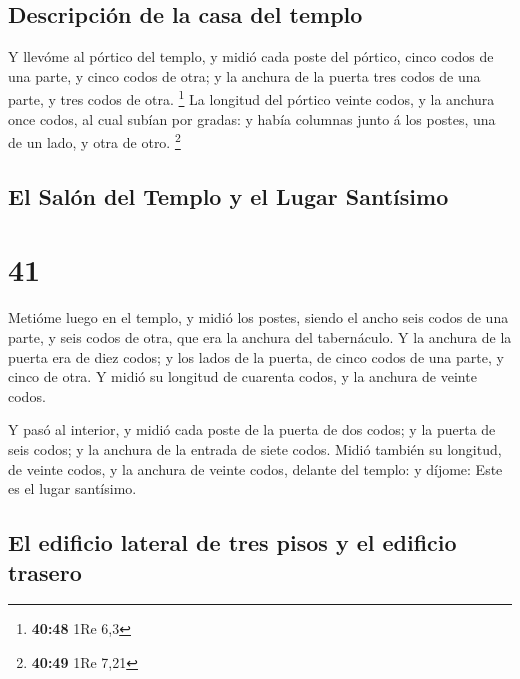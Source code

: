 \hypertarget{descripciuxf3n-de-la-casa-del-templo}{%
\subsection{Descripción de la casa del
templo}\label{descripciuxf3n-de-la-casa-del-templo}}

 Y llevóme al pórtico del templo, y midió cada poste del
pórtico, cinco codos de una parte, y cinco codos de otra; y la anchura
de la puerta tres codos de una parte, y tres codos de otra. \footnote{\textbf{40:48}
  1Re 6,3}  La longitud del pórtico veinte codos, y la
anchura once codos, al cual subían por gradas: y había columnas junto á
los postes, una de un lado, y otra de otro. \footnote{\textbf{40:49} 1Re
  7,21}

\hypertarget{el-saluxf3n-del-templo-y-el-lugar-santuxedsimo}{%
\subsection{El Salón del Templo y el Lugar
Santísimo}\label{el-saluxf3n-del-templo-y-el-lugar-santuxedsimo}}

\hypertarget{section-40}{%
\section{41}\label{section-40}}

 Metióme luego en el templo, y midió los postes, siendo el
ancho seis codos de una parte, y seis codos de otra, que era la anchura
del tabernáculo.  Y la anchura de la puerta era de diez
codos; y los lados de la puerta, de cinco codos de una parte, y cinco de
otra. Y midió su longitud de cuarenta codos, y la anchura de veinte
codos.

 Y pasó al interior, y midió cada poste de la puerta de dos
codos; y la puerta de seis codos; y la anchura de la entrada de siete
codos.  Midió también su longitud, de veinte codos, y la
anchura de veinte codos, delante del templo: y díjome: Este es el lugar
santísimo.

\hypertarget{el-edificio-lateral-de-tres-pisos-y-el-edificio-trasero}{%
\subsection{El edificio lateral de tres pisos y el edificio
trasero}\label{el-edificio-lateral-de-tres-pisos-y-el-edificio-trasero}}

